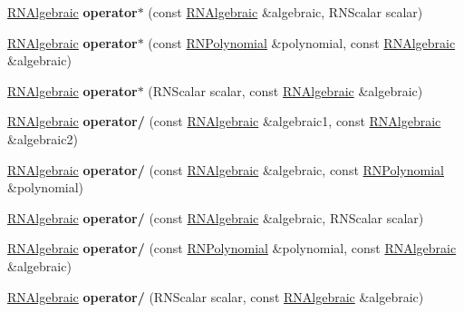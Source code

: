 \begin{DoxyCompactItemize}
\item 
\hyperlink{class_r_n_algebraic}{R\+N\+Algebraic} {\bfseries operator$\ast$} (const \hyperlink{class_r_n_algebraic}{R\+N\+Algebraic} \&algebraic, R\+N\+Scalar scalar)\hypertarget{class_r_n_algebraic_a0164454ec629459fb80b304151117bf6}{}\label{class_r_n_algebraic_a0164454ec629459fb80b304151117bf6}

\item 
\hyperlink{class_r_n_algebraic}{R\+N\+Algebraic} {\bfseries operator$\ast$} (const \hyperlink{class_r_n_polynomial}{R\+N\+Polynomial} \&polynomial, const \hyperlink{class_r_n_algebraic}{R\+N\+Algebraic} \&algebraic)\hypertarget{class_r_n_algebraic_ab5778cd0014e8d651261f2209f5ef15f}{}\label{class_r_n_algebraic_ab5778cd0014e8d651261f2209f5ef15f}

\item 
\hyperlink{class_r_n_algebraic}{R\+N\+Algebraic} {\bfseries operator$\ast$} (R\+N\+Scalar scalar, const \hyperlink{class_r_n_algebraic}{R\+N\+Algebraic} \&algebraic)\hypertarget{class_r_n_algebraic_af4cc29101386f6f063a35e749e71e8df}{}\label{class_r_n_algebraic_af4cc29101386f6f063a35e749e71e8df}

\item 
\hyperlink{class_r_n_algebraic}{R\+N\+Algebraic} {\bfseries operator/} (const \hyperlink{class_r_n_algebraic}{R\+N\+Algebraic} \&algebraic1, const \hyperlink{class_r_n_algebraic}{R\+N\+Algebraic} \&algebraic2)\hypertarget{class_r_n_algebraic_a305eea1d206855e654ccd07a65722566}{}\label{class_r_n_algebraic_a305eea1d206855e654ccd07a65722566}

\item 
\hyperlink{class_r_n_algebraic}{R\+N\+Algebraic} {\bfseries operator/} (const \hyperlink{class_r_n_algebraic}{R\+N\+Algebraic} \&algebraic, const \hyperlink{class_r_n_polynomial}{R\+N\+Polynomial} \&polynomial)\hypertarget{class_r_n_algebraic_ae576f9297829f0dfd9965245069b27a4}{}\label{class_r_n_algebraic_ae576f9297829f0dfd9965245069b27a4}

\item 
\hyperlink{class_r_n_algebraic}{R\+N\+Algebraic} {\bfseries operator/} (const \hyperlink{class_r_n_algebraic}{R\+N\+Algebraic} \&algebraic, R\+N\+Scalar scalar)\hypertarget{class_r_n_algebraic_a697125646cfa47e8351cbec00db180a9}{}\label{class_r_n_algebraic_a697125646cfa47e8351cbec00db180a9}

\item 
\hyperlink{class_r_n_algebraic}{R\+N\+Algebraic} {\bfseries operator/} (const \hyperlink{class_r_n_polynomial}{R\+N\+Polynomial} \&polynomial, const \hyperlink{class_r_n_algebraic}{R\+N\+Algebraic} \&algebraic)\hypertarget{class_r_n_algebraic_a9c5816448f7aed6ceb80b45e6c4833ed}{}\label{class_r_n_algebraic_a9c5816448f7aed6ceb80b45e6c4833ed}

\item 
\hyperlink{class_r_n_algebraic}{R\+N\+Algebraic} {\bfseries operator/} (R\+N\+Scalar scalar, const \hyperlink{class_r_n_algebraic}{R\+N\+Algebraic} \&algebraic)\hypertarget{class_r_n_algebraic_ae1b2e49c3cd7113797eccd42f9d321e8}{}\label{class_r_n_algebraic_ae1b2e49c3cd7113797eccd42f9d321e8}

\end{DoxyCompactItemize}


